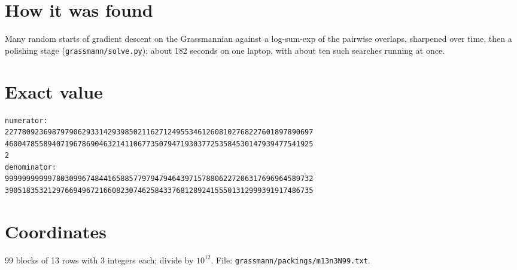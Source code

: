\documentclass[11pt,a4paper]{article}
\begin{document}
\section{How it was found}
Many random starts of gradient descent on the Grassmannian against a log-sum-exp of the pairwise overlaps, sharpened over time, then a polishing stage (\texttt{grassmann/solve.py}); about 182 seconds on one laptop, with about ten such searches running at once.


\appendix
\section{Exact value}
{\small
\begin{verbatim}
numerator:
227780923698797906293314293985021162712495534612608102768227601897890697
460047855894071967869046321411067735079471930377253584530147939477541925
2
denominator:
999999999997803099674844165885779794794643971578806227206317696964589732
390518353212976694967216608230746258433768128924155501312999391917486735
\end{verbatim}}

\section{Coordinates}
99 blocks of 13 rows with 3 integers each; divide by $10^{12}$. File: \texttt{grassmann/packings/m13n3N99.txt}.
{\tiny
\begin{multicols}{3}
\end{multicols}}
\end{document}
